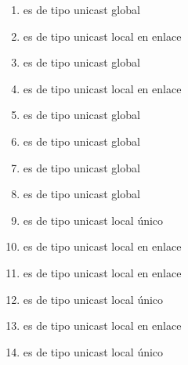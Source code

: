 \documentclass[letterpaper,10pt,spanish]{sphinxmanual}
\begin{document}
\begin{enumerate}
\item {} 
\sphinxAtStartPar
{} es de tipo unicast global

\item {} 
\sphinxAtStartPar
{} es de tipo unicast local en enlace

\item {} 
\sphinxAtStartPar
{} es de tipo unicast global

\item {} 
\sphinxAtStartPar
{} es de tipo unicast local en enlace

\item {} 
\sphinxAtStartPar
{} es de tipo unicast global

\item {} 
\sphinxAtStartPar
{} es de tipo unicast global

\item {} 
\sphinxAtStartPar
{} es de tipo unicast global

\item {} 
\sphinxAtStartPar
{} es de tipo unicast global

\item {} 
\sphinxAtStartPar
{} es de tipo unicast local único

\item {} 
\sphinxAtStartPar
{} es de tipo unicast local en enlace

\item {} 
\sphinxAtStartPar
{} es de tipo unicast local en enlace

\item {} 
\sphinxAtStartPar
{} es de tipo unicast local único

\item {} 
\sphinxAtStartPar
{} es de tipo unicast local en enlace

\item {} 
\sphinxAtStartPar
{} es de tipo unicast local único


\end{enumerate}
\end{document}
